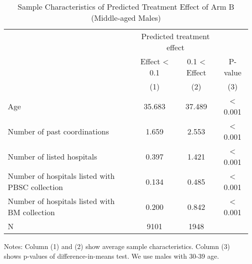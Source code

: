 \documentclass[
  lualatex,
  11pt,
  a4paper
]{article}
\begin{document}
\begin{table}[H]

\caption{\label{tab:rcf-middle-male}Sample Characteristics of Predicted Treatment Effect of Arm B (Middle-aged Males)}
\centering
\fontsize{9}{11}\selectfont
\fontsize{9}{11}\selectfont
\begin{threeparttable}
\begin{tabular}[t]{lccc}
\toprule
\multicolumn{1}{c}{ } & \multicolumn{2}{c}{Predicted treatment effect} & \multicolumn{1}{c}{ } \\
\cmidrule(l{3pt}r{3pt}){2-3}
\multicolumn{1}{c}{ } & \multicolumn{1}{c}{Effect < 0.1} & \multicolumn{1}{c}{0.1 < Effect} & \multicolumn{1}{c}{P-value} \\
\cmidrule(l{3pt}r{3pt}){2-2} \cmidrule(l{3pt}r{3pt}){3-3} \cmidrule(l{3pt}r{3pt}){4-4}
 & (1) & (2) & (3)\\
\midrule
Age & 35.683 & 37.489 & < 0.001\\
Number of past coordinations & 1.659 & 2.553 & < 0.001\\
Number of listed hospitals & 0.397 & 1.421 & < 0.001\\
Number of hospitals listed with PBSC collection & 0.134 & 0.485 & < 0.001\\
Number of hospitals listed with BM collection & 0.200 & 0.842 & < 0.001\\
N & 9101 & 1948 & \\
\bottomrule
\end{tabular}
\begin{tablenotes}
\item Notes: Column (1) and (2) show average sample characteristics. Column (3) shows p-values of difference-in-means test. We use males with 30-39 age.
\end{tablenotes}
\end{threeparttable}
\end{table}
\end{document}
